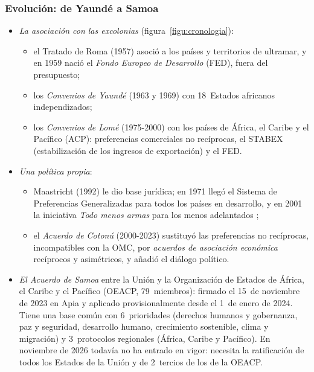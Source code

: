 \documentclass[11pt]{article}
\begin{document}
\subsubsection{Evolución: de Yaundé a Samoa}\label{sec:historia-coop}

\begin{itemize}
\item \emph{La asociación con las excolonias} (figura~\ref{figu:cronologia}):
  \begin{itemize}
  \item el Tratado de Roma (1957) asoció a los países y territorios de ultramar, y en 1959 nació el \emph{Fondo Europeo de Desarrollo} (FED), fuera del presupuesto;
  \item los \emph{Convenios de Yaundé} (1963 y 1969) con 18~Estados africanos independizados;
  \item los \emph{Convenios de Lomé} (1975-2000) con los países de África, el Caribe y el Pacífico (ACP): preferencias comerciales no recíprocas, el STABEX (estabilización de los ingresos de exportación) y el FED.
  \end{itemize}
\item \emph{Una política propia}:
  \begin{itemize}
  \item Maastricht (1992) le dio base jurídica; en 1971 llegó el Sistema de Preferencias Generalizadas para todos los países en desarrollo, y en 2001 la iniciativa \emph{Todo menos armas} para los menos adelantados ;
  \item el \emph{Acuerdo de Cotonú} (2000-2023) sustituyó las preferencias no recíprocas, incompatibles con la OMC, por \emph{acuerdos de asociación económica} recíprocos y asimétricos, y añadió el diálogo político.
  \end{itemize}
\item \emph{El Acuerdo de Samoa} entre la Unión y la Organización de Estados de África, el Caribe y el Pacífico (OEACP, 79~miembros): firmado el 15~de noviembre de 2023 en Apia y aplicado provisionalmente desde el 1~de enero de 2024. Tiene una base común con 6~prioridades (derechos humanos y gobernanza, paz y seguridad, desarrollo humano, crecimiento sostenible, clima y migración) y 3~protocolos regionales (África, Caribe y Pacífico). En noviembre de 2026 todavía no ha entrado en vigor: necesita la ratificación de todos los Estados de la Unión y de 2~tercios de los de la OEACP\nocite{PE2026Samoa}.
\end{itemize}
\end{document}
